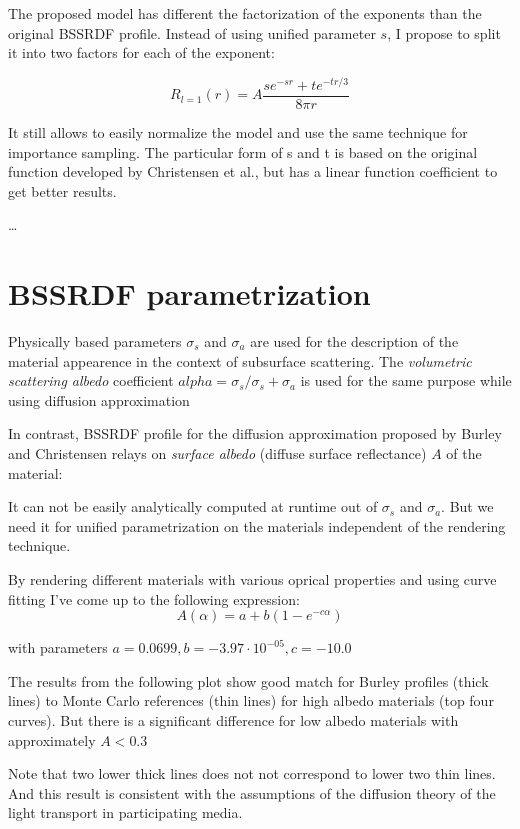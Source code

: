The proposed model has different the factorization of the exponents than the
original \gls{BSSRDF} profile. Instead of using unified parameter $s$, I propose
to split it into two factors for each of the exponent:

\begin{equation}\label{eq:burley_modified}
R_{l=1}(r) = A\dfrac{se^{-sr}+te^{-tr/3}}{8\pi r}
\end{equation}

It still allows to easily normalize the model and use the same technique for
importance sampling. The particular form of s and t is based on the original
function developed by Christensen et al., but has a linear function coefficient
to get better results.

\ldots



\section{BSSRDF parametrization}
Physically based parameters $\sigma_s$ and $\sigma_a$ are used for the
description of the material appearence in the context of subsurface
scattering. The \textit{volumetric scattering albedo} coefficient
$alpha = \sigma_s / \sigma_s+\sigma_a$ is used for the same purpose while using
diffusion approximation


In contrast, BSSRDF profile for the diffusion approximation proposed by Burley
and Christensen relays on \textit{surface albedo} (diffuse surface reflectance)
$A$ of the material:



It can not be easily analytically computed at runtime out of $\sigma_s$ and $\sigma_a$. But we need it for unified parametrization on the materials independent of the rendering technique.

By rendering different materials with various oprical properties and using curve
fitting I've come up to the following expression:
\[
A(\alpha) = a + b(1- e^{-c\alpha})
\]

with parameters $a = 0.0699, b = -3.97\cdot 10^{-05}, c =-10.0$

The results from the following plot show good match for Burley profiles (thick
lines) to Monte Carlo references (thin lines) for high albedo materials (top
four curves). But there is a significant difference for low albedo materials
with approximately $A<0.3$

Note that two lower thick lines does not not correspond to lower two thin lines.
And this result is consistent with the assumptions of the diffusion theory of
the light transport in participating media.




